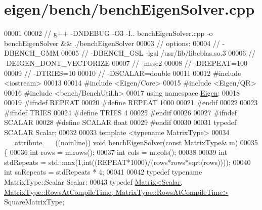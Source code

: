 \hypertarget{eigen_2bench_2bench_eigen_solver_8cpp_source}{}\section{eigen/bench/bench\+Eigen\+Solver.cpp}
\label{eigen_2bench_2bench_eigen_solver_8cpp_source}

\begin{DoxyCode}
00001 
00002 \textcolor{comment}{// g++ -DNDEBUG -O3 -I.. benchEigenSolver.cpp  -o benchEigenSolver && ./benchEigenSolver}
00003 \textcolor{comment}{// options:}
00004 \textcolor{comment}{//  -DBENCH\_GMM}
00005 \textcolor{comment}{//  -DBENCH\_GSL -lgsl /usr/lib/libcblas.so.3}
00006 \textcolor{comment}{//  -DEIGEN\_DONT\_VECTORIZE}
00007 \textcolor{comment}{//  -msse2}
00008 \textcolor{comment}{//  -DREPEAT=100}
00009 \textcolor{comment}{//  -DTRIES=10}
00010 \textcolor{comment}{//  -DSCALAR=double}
00011 
00012 \textcolor{preprocessor}{#include <iostream>}
00013 
00014 \textcolor{preprocessor}{#include <Eigen/Core>}
00015 \textcolor{preprocessor}{#include <Eigen/QR>}
00016 \textcolor{preprocessor}{#include <bench/BenchUtil.h>}
00017 \textcolor{keyword}{using namespace }\hyperlink{namespace_eigen}{Eigen};
00018 
00019 \textcolor{preprocessor}{#ifndef REPEAT}
00020 \textcolor{preprocessor}{#define REPEAT 1000}
00021 \textcolor{preprocessor}{#endif}
00022 
00023 \textcolor{preprocessor}{#ifndef TRIES}
00024 \textcolor{preprocessor}{#define TRIES 4}
00025 \textcolor{preprocessor}{#endif}
00026 
00027 \textcolor{preprocessor}{#ifndef SCALAR}
00028 \textcolor{preprocessor}{#define SCALAR float}
00029 \textcolor{preprocessor}{#endif}
00030 
00031 \textcolor{keyword}{typedef} SCALAR Scalar;
00032 
00033 \textcolor{keyword}{template} <\textcolor{keyword}{typename} MatrixType>
00034 \_\_attribute\_\_ ((noinline)) \textcolor{keywordtype}{void} benchEigenSolver(\textcolor{keyword}{const} MatrixType& m)
00035 \{
00036   \textcolor{keywordtype}{int} rows = m.rows();
00037   \textcolor{keywordtype}{int} cols = m.cols();
00038 
00039   \textcolor{keywordtype}{int} stdRepeats = std::max(1,\textcolor{keywordtype}{int}((REPEAT*1000)/(rows*rows*sqrt(rows))));
00040   \textcolor{keywordtype}{int} saRepeats = stdRepeats * 4;
00041 
00042   \textcolor{keyword}{typedef} \textcolor{keyword}{typename} MatrixType::Scalar Scalar;
00043   \textcolor{keyword}{typedef} 
      \hyperlink{group___core___module_class_eigen_1_1_matrix}{Matrix<Scalar, MatrixType::RowsAtCompileTime, MatrixType::RowsAtCompileTime>}
       SquareMatrixType;

\end{DoxyCode}
